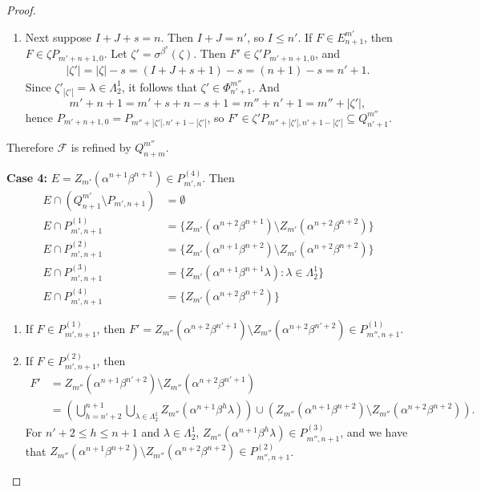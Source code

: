 \documentclass[12pt]{amsart}
\newcommand{\sm}{\setminus}
\newcommand{\sse}{\subseteq}
\newcommand{\mc}[1]{\mathcal{#1}}
\newcommand{\emp}{\emptyset}
\newcommand{\al}{\alpha}
\newcommand{\be}{\beta}
\newcommand{\ze}{\zeta}
\newcommand{\la}{\lambda}
\newcommand{\La}{\Lambda}
\newcommand{\si}{\sigma}
\theoremstyle{plain} %
\theoremstyle{definition} %
\begin{document}
\begin{proof}
\begin{enumerate}
        \item Next suppose $I+J+s = n$. Then $I+J = n'$, so $I \leq n'$. If $F \in E_{n+1}^{m'}$, then $F \in \ze P_{m'+n+1, 0}$. Let $\ze' = \si^{\be^s}(\ze)$. Then $F' \in \ze' P_{m'+n+1,0}$, and \begin{align*}
        |\ze'| = |\ze|-s = (I+J+s + 1)-s = (n+1)-s = n'+1.
        \end{align*}
        Since $\ze'_{|\ze'|} = \la \in \La_2^1$, it follows that $\ze' \in \Phi_{n'+1}^{m''}$. And \[m' + n+1 = m' + s+n-s+1 = m'' + n' + 1 = m'' + |\ze'|,\] hence $P_{m'+n+1,0} = P_{m'' + |\ze'|, n'+1 - |\ze'|}$, so $F' \in \ze' P_{m'' + |\ze'|, n'+1 - |\ze'|} \sse Q_{n'+1}^{m''}$.
    \end{enumerate}
    Therefore $\mc{F}$ is refined by $Q_{n+m}^{m''}$.

    \textbf{Case 4:} $E = Z_{m'}(\al^{n+1}\be^{n+1}) \in P^{(4)}_{m', n}$. Then
    \begin{align*}
        E \cap (Q^{m'}_{n+1} \sm P_{m', n+1}) &= \emp\\
        E \cap P^{(1)}_{m',n+1} &= \{Z_{m'}(\al^{n+2}\be^{n+1}) \sm Z_{m'}(\al^{n+2}\be^{n+2})\} \\
        E \cap P^{(2)}_{m',n+1} &= \{ Z_{m'}(\al^{n+1}\be^{n+2}) \sm Z_{m'}(\al^{n+2} \be^{n+2}) \}\\
        E \cap P^{(3)}_{m',n+1} &= \{ Z_{m'}(\al^{n+1}\be^{n+1} \la) : \la \in \La_2^1\} \\
        E \cap P^{(4)}_{m',n+1} &= \{Z_{m'}(\al^{n+2}\be^{n+2})\}
    \end{align*}
    \begin{enumerate}
        \item If $F \in P^{(1)}_{m',n+1}$, then $F' = Z_{m''}(\al^{n+2}\be^{n'+1}) \sm Z_{m''}(\al^{n+2}\be^{n'+2}) \in P_{m'',n+1}^{(1)}$.

    \item If $F \in P^{(2)}_{m',n+1}$, then 
    \begin{align*}
        F' &= Z_{m''}(\al^{n+1}\be^{n'+2})\sm Z_{m''}(\al^{n+2}\be^{n'+1})\\
        &= \left( \bigcup_{h=n'+2}^{n+1} \bigcup_{\la\in\La_2^1} Z_{m''}(\al^{n+1}\be^{h}\la) \right) \cup \left( Z_{m''}(\al^{n+1}\be^{n+2})\sm Z_{m''}(\al^{n+2} \be^{n+2})\right).
    \end{align*}
    For $n'+2 \le h \le n+1$ and $\la \in \La_2^1$, $Z_{m''}(\al^{n+1}\be^{h}\la) \in P^{(3)}_{m'', n+1}$, and we have that $Z_{m''}(\al^{n+1}\be^{n+2})\sm Z_{m''}(\al^{n+2} \be^{n+2}) \in P^{(2)}_{m'', n+1}$.


\end{enumerate}
\end{proof}
\end{document}
